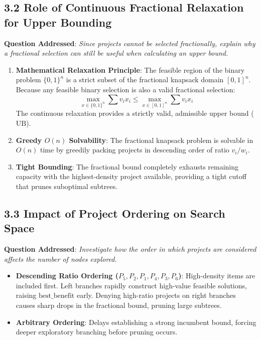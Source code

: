 \documentclass[12pt]{article}
\begin{document}
\subsection*{3.2 Role of Continuous Fractional Relaxation for Upper Bounding}
\textbf{Question Addressed}: \textit{Since projects cannot be selected fractionally, explain why a fractional selection can still be useful when calculating an upper bound.}

\begin{enumerate}
    \item \textbf{Mathematical Relaxation Principle}: The feasible region of the binary problem $\{0, 1\}^n$ is a strict subset of the fractional knapsack domain $[0, 1]^n$. Because any feasible binary selection is also a valid fractional selection:
    \[
    \max_{x \in \{0, 1\}^n} \sum v_i x_i \le \max_{x \in [0, 1]^n} \sum v_i x_i
    \]
    The continuous relaxation provides a strictly valid, admissible upper bound ($\text{UB}$).
    \item \textbf{Greedy $O(n)$ Solvability}: The fractional knapsack problem is solvable in $O(n)$ time by greedily packing projects in descending order of ratio $v_i / w_i$.
    \item \textbf{Tight Bounding}: The fractional bound completely exhausts remaining capacity with the highest-density project available, providing a tight cutoff that prunes suboptimal subtrees.
\end{enumerate}

\subsection*{3.3 Impact of Project Ordering on Search Space}
\textbf{Question Addressed}: \textit{Investigate how the order in which projects are considered affects the number of nodes explored.}
\begin{itemize}
    \item \textbf{Descending Ratio Ordering ($P_5, P_2, P_1, P_4, P_3, P_6$)}: High-density items are included first. Left branches rapidly construct high-value feasible solutions, raising $\text{best\_benefit}$ early. Denying high-ratio projects on right branches causes sharp drops in the fractional bound, pruning large subtrees.
    \item \textbf{Arbitrary Ordering}: Delays establishing a strong incumbent bound, forcing deeper exploratory branching before pruning occurs.
\end{itemize}
\end{document}
